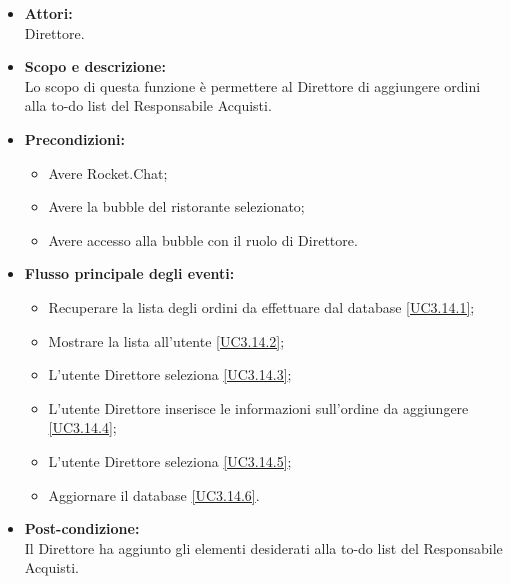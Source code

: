 \begin{itemize}
	\item \textbf{Attori:}
	\\Direttore.
	\item \textbf{Scopo e descrizione:} 
	\\Lo scopo di questa funzione è permettere al Direttore di aggiungere ordini alla to-do list del Responsabile Acquisti.
	\item \textbf{Precondizioni:}
	\begin{itemize}
		\item Avere Rocket.Chat;
		\item Avere la bubble del ristorante selezionato;
		\item Avere accesso alla bubble con il ruolo di Direttore.
	\end{itemize}
	\item \textbf{Flusso principale degli eventi:}
	\begin{itemize}
		\item Recuperare la lista degli ordini da effettuare dal database \ref{UC3.14.1};
		\item Mostrare la lista all'utente \ref{UC3.14.2};
		\item L'utente Direttore seleziona  \ref{UC3.14.3};
		\item L'utente Direttore inserisce le informazioni sull'ordine da aggiungere \ref{UC3.14.4};
		\item L'utente Direttore seleziona  \ref{UC3.14.5};
		\item Aggiornare il database \ref{UC3.14.6}.
	\end{itemize}
	\item \textbf{Post-condizione:}
	\\Il Direttore ha aggiunto gli elementi desiderati alla to-do list del Responsabile Acquisti.
\end{itemize}


